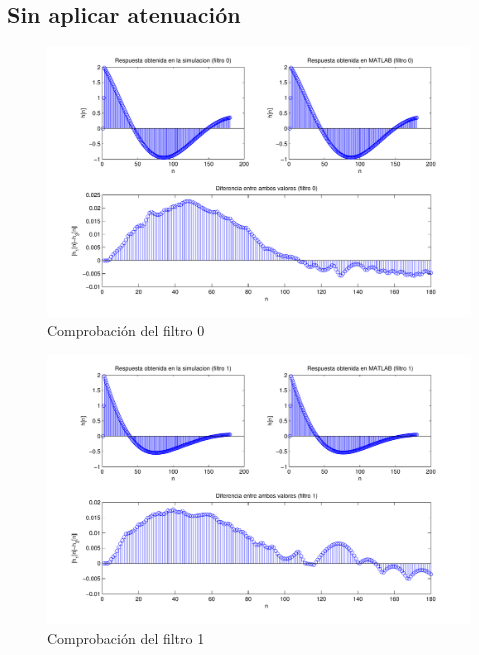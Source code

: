 \documentclass[a4paper,12pt]{article}
\begin{document}
\subsection{Sin aplicar atenuación}
\begin{figure}[hbt]
\includegraphics[width=\textwidth]{img/respfiltro0.pdf} 
\caption{Comprobación del filtro 0} \label{fig:filter0}
\end{figure}

\begin{figure}[hbt]
\includegraphics[width=\textwidth]{img/respfiltro1.pdf} 
\caption{Comprobación del filtro 1} \label{fig:filter1}
\end{figure}
\end{document}
